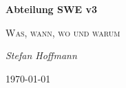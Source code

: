 \begin{titlepage}
	\centering
	\vspace*{5cm}
	{\huge\bfseries Abteilung SWE v3\par}
	{\scshape\LARGE Was, wann, wo und warum\par}
	\vspace{2cm}
	{\Large\itshape Stefan Hoffmann\par}
	\vfill
	{\large \today\par}
\end{titlepage}
